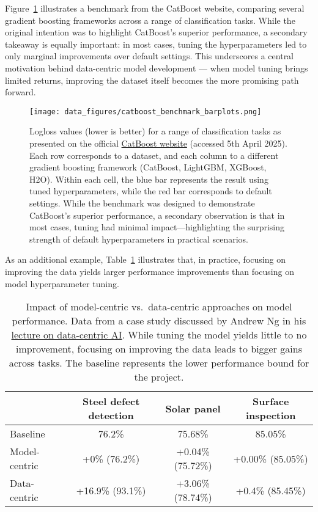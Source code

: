 \documentclass[12pt,openany]{book}
\begin{document}
Figure~\ref{fig:catboost-benchmark} illustrates a benchmark from the CatBoost website, comparing several gradient boosting frameworks across a range of classification tasks. While the original intention was to highlight CatBoost’s superior performance, a secondary takeaway is equally important: in most cases, tuning the hyperparameters led to only marginal improvements over default settings. This underscores a central motivation behind data-centric model development — when model tuning brings limited returns, improving the dataset itself becomes the more promising path forward.

\begin{figure}[H]
    \centering
    \texttt{[image: data\_figures/catboost\_benchmark\_barplots.png]}
    \caption{
    Logloss values (lower is better) for a range of classification tasks as presented on the official \href{https://catboost.ai/}{CatBoost website} (accessed 5th April 2025). Each row corresponds to a dataset, and each column to a different gradient boosting framework (CatBoost, LightGBM, XGBoost, H2O). Within each cell, the blue bar represents the result using tuned hyperparameters, while the red bar corresponds to default settings. While the benchmark was designed to demonstrate CatBoost’s superior performance, a secondary observation is that in most cases, tuning had minimal impact—highlighting the surprising strength of default hyperparameters in practical scenarios.
    }
    \label{fig:catboost-benchmark}
\end{figure}

As an additional example, Table~\ref{tab:data-centric-vs-model-centric} illustrates that, in practice, focusing on improving the data yields larger performance improvements than focusing on model hyperparameter tuning.

\begin{table}[H]
\centering
\caption{Impact of model-centric vs.\ data-centric approaches on model performance. Data from a case study discussed by Andrew Ng in his \href{https://www.youtube.com/watch?v=06-AZXmwHjo&t=911s}{lecture on data-centric AI}. While tuning the model yields little to no improvement, focusing on improving the data leads to bigger gains across tasks. The baseline represents the lower performance bound for the project.}
\label{tab:data-centric-vs-model-centric}
\vspace{0.1cm}
\renewcommand{\arraystretch}{1.4}
\begin{tabular}{|l|c|c|c|}
\hline
\textbf{} & \textbf{Steel defect detection} & \textbf{Solar panel} & \textbf{Surface inspection} \\
\hline
Baseline & 76.2\% & 75.68\% & 85.05\% \\
\hline
Model-centric & +0\% (76.2\%) & +0.04\% (75.72\%) & +0.00\% (85.05\%) \\
\hline
Data-centric & +16.9\% (93.1\%) & +3.06\% (78.74\%) & +0.4\% (85.45\%) \\
\hline
\end{tabular}
\end{table}
\end{document}
